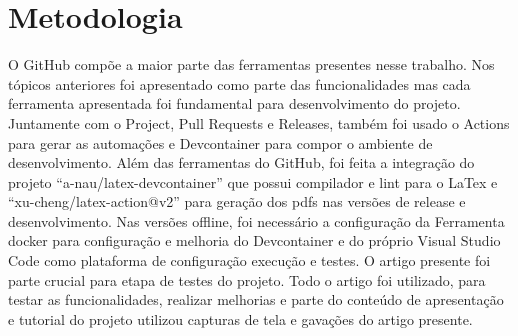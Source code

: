 \section{Metodologia}

O GitHub compõe a maior parte das ferramentas presentes nesse trabalho. Nos tópicos anteriores foi apresentado como parte das funcionalidades mas cada ferramenta apresentada foi fundamental para desenvolvimento do projeto. 
Juntamente com o Project, Pull Requests e Releases, também foi usado o Actions para gerar as automações e Devcontainer para compor o ambiente de desenvolvimento.
Além das ferramentas do GitHub, foi feita a integração do projeto ``a-nau/latex-devcontainer'' que possui compilador e lint para o LaTex e ``xu-cheng/latex-action@v2'' para geração dos pdfs nas versões de release e desenvolvimento.
Nas versões offline, foi necessário a configuração da Ferramenta docker para configuração e melhoria do Devcontainer e do próprio Visual Studio Code como plataforma de configuração execução e testes.
O artigo presente foi parte crucial para etapa de testes do projeto. Todo o artigo foi utilizado, para testar as funcionalidades, realizar melhorias e parte do conteúdo de apresentação e tutorial do projeto utilizou capturas de tela e gavações do artigo presente.